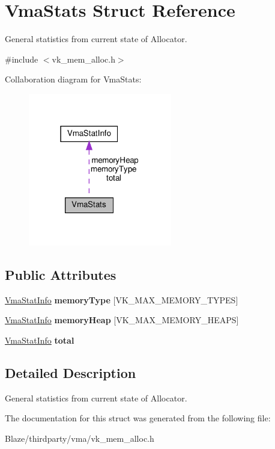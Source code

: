 \hypertarget{structVmaStats}{}\section{Vma\+Stats Struct Reference}
\label{structVmaStats}


General statistics from current state of Allocator.  




{\ttfamily \#include $<$vk\+\_\+mem\+\_\+alloc.\+h$>$}



Collaboration diagram for Vma\+Stats\+:\nopagebreak
\begin{figure}[H]
\begin{center}
\leavevmode
\includegraphics[width=178pt]{structVmaStats__coll__graph}
\end{center}
\end{figure}
\subsection*{Public Attributes}
\begin{DoxyCompactItemize}
\item 
\mbox{\label{structVmaStats_a13e3caf754be79352c42408756309331}} 
\hyperlink{structVmaStatInfo}{Vma\+Stat\+Info} {\bfseries memory\+Type} \mbox{[}V\+K\+\_\+\+M\+A\+X\+\_\+\+M\+E\+M\+O\+R\+Y\+\_\+\+T\+Y\+P\+ES\mbox{]}
\item 
\mbox{\label{structVmaStats_a0e6611508c29a187f0fd14ff1a0329c0}} 
\hyperlink{structVmaStatInfo}{Vma\+Stat\+Info} {\bfseries memory\+Heap} \mbox{[}V\+K\+\_\+\+M\+A\+X\+\_\+\+M\+E\+M\+O\+R\+Y\+\_\+\+H\+E\+A\+PS\mbox{]}
\item 
\mbox{\label{structVmaStats_a2e8f5b3353f2fefef3c27f29e245a1f9}} 
\hyperlink{structVmaStatInfo}{Vma\+Stat\+Info} {\bfseries total}
\end{DoxyCompactItemize}


\subsection{Detailed Description}
General statistics from current state of Allocator. 

The documentation for this struct was generated from the following file\+:\begin{DoxyCompactItemize}
\item 
Blaze/thirdparty/vma/vk\+\_\+mem\+\_\+alloc.\+h\end{DoxyCompactItemize}
